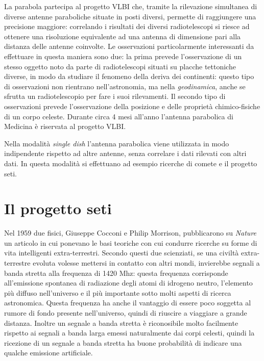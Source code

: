 La parabola partecipa al progetto \ac{VLBI} che, tramite la rilevazione
simultanea di diverse antenne paraboliche situate in posti diversi, permette di
raggiungere una precisione maggiore: correlando i risultati dei diversi
radiotelescopi si riesce ad ottenere una risoluzione equivalente ad una antenna
di dimensione pari alla distanza delle antenne coinvolte. Le osservazioni
particolarmente interessanti da effettuare in questa maniera sono due: la prima
prevede l'osservazione di un stesso oggetto noto da parte di radiotelescopi
situati su placche tettoniche diverse, in modo da studiare il fenomeno della
deriva dei continenti: questo tipo di osservazioni non rientrano
nell'astronomia, ma nella \emph{geodinamica}, anche se sfrutta un
radiotelescopio per fare i suoi rilevamenti. Il secondo tipo di osservazioni
prevede l'osservazione della posizione e delle propriet\`a chimico-fisiche di
un corpo celeste. Durante circa 4 mesi all'anno l'antenna parabolica di
Medicina \`e riservata al progetto \ac{VLBI}.

Nella modalit\`a \emph{single dish} l'antenna parabolica viene utilizzata in
modo indipendente rispetto ad altre antenne, senza correlare i dati rilevati con
altri dati. In questa modalit\`a si effettuano ad esempio ricerche di comete e
il progetto \ac{seti}.

\section*{Il progetto \ac{seti}}
Nel 1959 due fisici, Giuseppe Cocconi e Philip Morrison, pubblicarono su
\emph{Nature} un articolo \cite{CMSETI59} in cui ponevano le basi teoriche con cui condurre
ricerche su forme di vita intelligenti extra-terrestri. Secondo questi due
scienziati, se una civilt\`a extra-terrestre evoluta volesse mettersi in
contatto con altri mondi, invierebbe segnali a banda stretta alla frequenza di
1420 Mhz: questa frequenza corrisponde all'emissione spontanea di radiazione
degli atomi di idrogeno neutro, l'elemento pi\`u diffuso nell'universo e il
pi\`u importante sotto molti aspetti di ricerca astronomica. Questa frequenza ha
anche il vantaggio di essere poco soggetta al rumore di fondo presente
nell'universo, quindi di riuscire a viaggiare a grande distanza. Inoltre un
segnale a banda stretta \`e riconosibile molto facilmente rispetto ai segnali a
banda larga emessi naturalmente dai corpi celesti, quindi la ricezione di un
segnale a banda stretta ha buone probabilit\`a di indicare una qualche emissione
artificiale.

